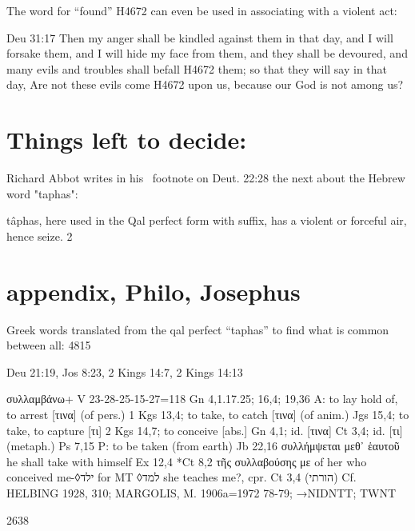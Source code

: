 \documentclass[11pt]{article}
\begin{document}
The word for “found” H4672 can even be used in associating with a violent act:

Deu 31:17
Then my anger shall be kindled against them in that day, and I will forsake them, and I will hide my face from them, and they shall be devoured, and many evils and troubles shall befall H4672 them; so that they will say in that day, Are not these evils come H4672 upon us, because our God is not among us?



\section{Things left to decide:}

Richard Abbot writes in his  footnote on Deut. 22:28 the next about the Hebrew word "taphas": 

tâphas, here used in the Qal perfect form with suffix, has a violent or forceful air, hence seize. 2


\section{appendix, Philo, Josephus}

Greek words translated from the qal perfect “taphas” to find what is common between all:
4815

Deu 21:19, Jos 8:23, 2 Kings 14:7, 2 Kings 14:13
\begin{greek}
συλλαμβάνω+ V 23-28-25-15-27=118
Gn 4,1.17.25; 16,4; 19,36
A: to lay hold of, to arrest [τινα] (of pers.) 1 Kgs 13,4; to take, to catch [τινα] (of anim.) Jgs 15,4; to
take, to capture [τι] 2 Kgs 14,7; to conceive [abs.] Gn 4,1; id. [τινα] Ct 3,4; id. [τι] (metaph.) Ps 7,15
P: to be taken (from earth) Jb 22,16
συλλήμψεται μεθ᾽ ἑαυτοῦ he shall take with himself Ex 12,4
*Ct 8,2 τῆς συλλαβούσης με of her who conceived me-◊ילד for MT ◊למד she teaches me?, cpr. Ct 3,4
 (הורתי)
Cf. HELBING 1928, 310; MARGOLIS, M. 1906a=1972 78-79; →NIDNTT; TWNT
\end{greek}


2638
\end{document}

